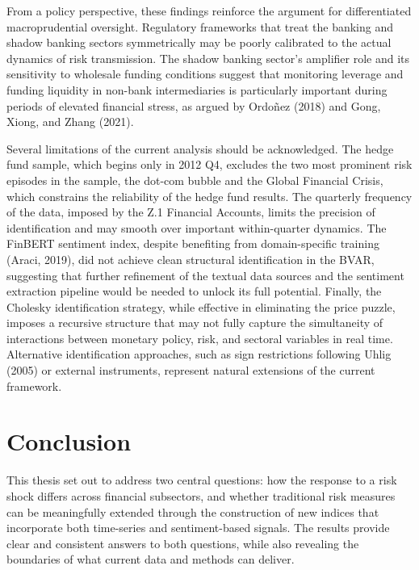 \documentclass[12pt,a4paper]{report}
\begin{document}
From a policy perspective, these findings reinforce the argument for differentiated
macroprudential oversight. Regulatory frameworks that treat the banking and
shadow banking sectors symmetrically may be poorly calibrated to the actual
dynamics of risk transmission. The shadow banking sector's amplifier role and
its sensitivity to wholesale funding conditions suggest that monitoring leverage
and funding liquidity in non-bank intermediaries is particularly important during
periods of elevated financial stress, as argued by Ordoñez (2018) and Gong,
Xiong, and Zhang (2021).

Several limitations of the current analysis should be acknowledged. The hedge
fund sample, which begins only in 2012 Q4, excludes the two most prominent
risk episodes in the sample, the dot-com bubble and the Global Financial
Crisis, which constrains the reliability of the hedge fund results. The quarterly
frequency of the data, imposed by the Z.1 Financial Accounts, limits the
precision of identification and may smooth over important within-quarter
dynamics. The FinBERT sentiment index, despite benefiting from domain-specific
training (Araci, 2019), did not achieve clean structural identification in the
BVAR, suggesting that further refinement of the textual data sources and the
sentiment extraction pipeline would be needed to unlock its full potential.
Finally, the Cholesky identification strategy, while effective in eliminating the
price puzzle, imposes a recursive structure that may not fully capture the
simultaneity of interactions between monetary policy, risk, and sectoral variables
in real time. Alternative identification approaches, such as sign restrictions
following Uhlig (2005) or external instruments, represent natural extensions of
the current framework.




\chapter*{Conclusion}
\label{chap:conclusion}
This thesis set out to address two central questions: how the response to a risk shock differs across financial subsectors, and whether traditional risk measures can be meaningfully extended through the construction of new indices that incorporate both time-series and sentiment-based signals. The results provide clear and consistent answers to both questions, while also revealing the boundaries of what current data and methods can deliver.
\end{document}
